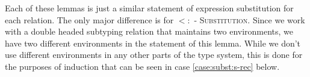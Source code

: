 \documentclass{llncs}
\numberwithin{subcase}{casethm}
\numberwithin{casethm}{theorem}
\numberwithin{casethm}{lemma}
\begin{document}
Each of these lemmas is just a similar statement of expression 
substitution for each relation. The only major difference is 
for \textsc{$<:$ - Substitution}. Since we work with a double 
headed subtyping relation that maintains two environments, 
we have two different environments in the statement of this
lemma. While we don't use different environments in any other 
parts of the type system, this is done for the purposes of 
induction that can be seen in case \ref{case:subst:s-rec} below.
\end{document}
